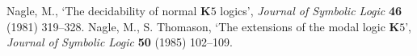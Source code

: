 \documentclass[draft]{article}
\def\S{\mathbf{S}}
\def\K{\mathbf{K}}
\def\KTB{\mathbf{KTB}}
\begin{document}
\begin{thebibliography}{}
%
%
%
%
%
%
%
%
%
%
{\sc Nagle,} M.,
`The decidability of normal $\K5$ logics',
\emph{Journal of Symbolic Logic}\/ {\bf 46} (1981) 319--328.
%
%
{\sc Nagle,} M., S. {\sc Thomason,}
`The extensions of the modal logic $\K5$',
\emph{Journal of Symbolic Logic} {\bf 50} (1985) 102--109.
%
%
%
%
%
%
%
%
%
%
%
%
%
%
%
%
%
%

\end{thebibliography}
\end{document}
